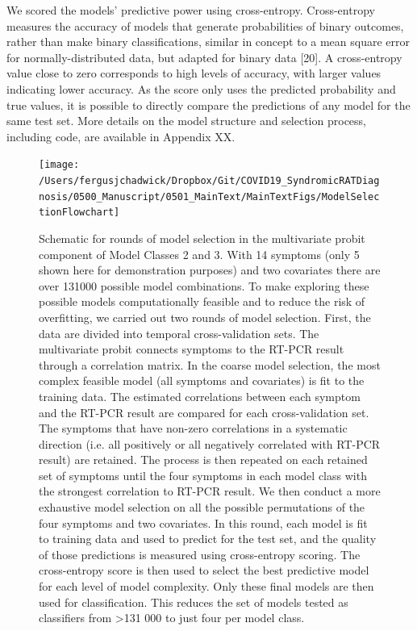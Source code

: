 \documentclass[]{elsarticle} %
\begin{document}
We scored the models' predictive power using cross-entropy.
Cross-entropy measures the accuracy of models that generate probabilities of binary outcomes, rather than make binary classifications, similar in concept to a mean square error for normally-distributed data, but adapted for binary data {[}20{]}.
A cross-entropy value close to zero corresponds to high levels of accuracy, with larger values indicating lower accuracy.
As the score only uses the predicted probability and true values, it is possible to directly compare the predictions of any model for the same test set.
More details on the model structure and selection process, including code, are available in Appendix XX.

\begin{figure}
\texttt{[image: /Users/fergusjchadwick/Dropbox/Git/COVID19\_SyndromicRATDiagnosis/0500\_Manuscript/0501\_MainText/MainTextFigs/ModelSelectionFlowchart]} \caption{Schematic for rounds of model selection in the multivariate probit component of Model Classes 2 and 3. With 14 symptoms (only 5 shown here for demonstration purposes) and two covariates there are over 131000 possible model combinations. To make exploring these possible models computationally feasible and to reduce the risk of overfitting, we carried out two rounds of model selection. First, the data are divided into temporal cross-validation sets. The multivariate probit connects symptoms to the RT-PCR result through a correlation matrix. In the coarse model selection, the most complex feasible model (all symptoms and covariates) is fit to the training data. The estimated correlations between each symptom and the RT-PCR result are compared for each cross-validation set. The symptoms that have non-zero correlations in a systematic direction (i.e. all positively or all negatively correlated with RT-PCR result) are retained. The process is then repeated on each retained set of symptoms until the four symptoms in each model class with the strongest correlation to RT-PCR result. We then conduct a more exhaustive model selection on all the possible permutations of the four symptoms and two covariates. In this round, each model is fit to training data and used to predict for the test set, and the quality of those predictions is measured using cross-entropy scoring. The cross-entropy score is then used to select the best predictive model for each level of model complexity. Only these final models are then used for classification. This reduces the set of models tested as classifiers from >131 000 to just four per model class.}\label{fig:modsel-flowchart}
\end{figure}
\end{document}
